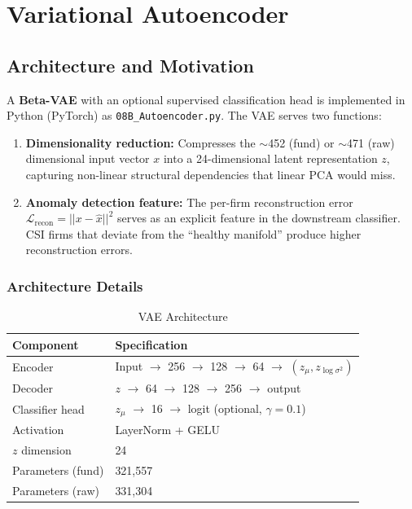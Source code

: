 \documentclass{report}\usepackage[]{graphicx}\usepackage[table]{xcolor}
\begin{document}
\chapter{Variational Autoencoder}
\label{ch:vae}

\section{Architecture and Motivation}

A \textbf{Beta-VAE} with an optional supervised classification head is implemented 
in Python (PyTorch) as \texttt{08B\_Autoencoder.py}. The VAE serves two functions:

\begin{enumerate}
    \item \textbf{Dimensionality reduction:} Compresses the $\sim$452 (fund) or $\sim$471 (raw) 
    dimensional input vector $x$ into a 24-dimensional latent representation $z$, 
    capturing non-linear structural dependencies that linear PCA would miss.
    
    \item \textbf{Anomaly detection feature:} The per-firm reconstruction error 
    $\mathcal{L}_{\text{recon}} = ||x - \hat{x}||^2$ serves as an explicit feature 
    in the downstream classifier. CSI firms that deviate from the ``healthy manifold'' 
    produce higher reconstruction errors.
\end{enumerate}

\subsection{Architecture Details}

\begin{table}[H]
\centering
\caption{VAE Architecture}
\begin{tabular}{ll}
\toprule
\textbf{Component} & \textbf{Specification} \\
\midrule
Encoder & Input $\rightarrow$ 256 $\rightarrow$ 128 $\rightarrow$ 64 $\rightarrow$ $(z_\mu, z_{\log\sigma^2})$ \\
Decoder & $z$ $\rightarrow$ 64 $\rightarrow$ 128 $\rightarrow$ 256 $\rightarrow$ output \\
Classifier head & $z_\mu$ $\rightarrow$ 16 $\rightarrow$ logit (optional, $\gamma = 0.1$) \\
Activation & LayerNorm + GELU \\
$z$ dimension & 24 \\
Parameters (fund) & 321,557 \\
Parameters (raw) & 331,304 \\
\bottomrule
\end{tabular}
\end{table}
\end{document}
